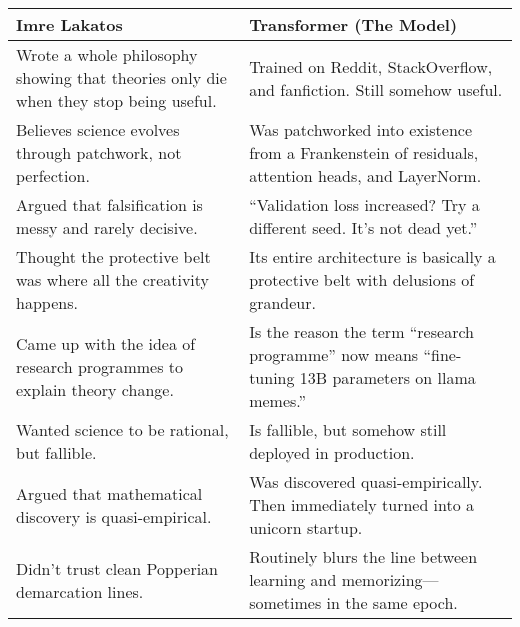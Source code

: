 \begin{tcolorbox}[colback=gray!5!white, colframe=black, title=\textbf{Lakatos vs. Transformer}, fonttitle=\bfseries, arc=1.5mm, boxrule=0.4pt]

\begin{tabular}{p{6.5cm} | p{6.5cm}}
\textbf{Imre Lakatos} & \textbf{Transformer (The Model)} \\
\hline
Wrote a whole philosophy showing that theories only die when they stop being useful. & Trained on Reddit, StackOverflow, and fanfiction. Still somehow useful. \\
\hline
Believes science evolves through patchwork, not perfection. & Was patchworked into existence from a Frankenstein of residuals, attention heads, and LayerNorm. \\
\hline
Argued that falsification is messy and rarely decisive. & “Validation loss increased? Try a different seed. It's not dead yet.” \\
\hline
Thought the protective belt was where all the creativity happens. & Its entire architecture is basically a protective belt with delusions of grandeur. \\
\hline
Came up with the idea of research programmes to explain theory change. & Is the reason the term “research programme” now means “fine-tuning 13B parameters on llama memes.” \\
\hline
Wanted science to be rational, but fallible. & Is fallible, but somehow still deployed in production. \\
\hline
Argued that mathematical discovery is quasi-empirical. & Was discovered quasi-empirically. Then immediately turned into a unicorn startup. \\
\hline
Didn’t trust clean Popperian demarcation lines. & Routinely blurs the line between learning and memorizing—sometimes in the same epoch. \\
\hline
\end{tabular}

\end{tcolorbox}

\bigskip

